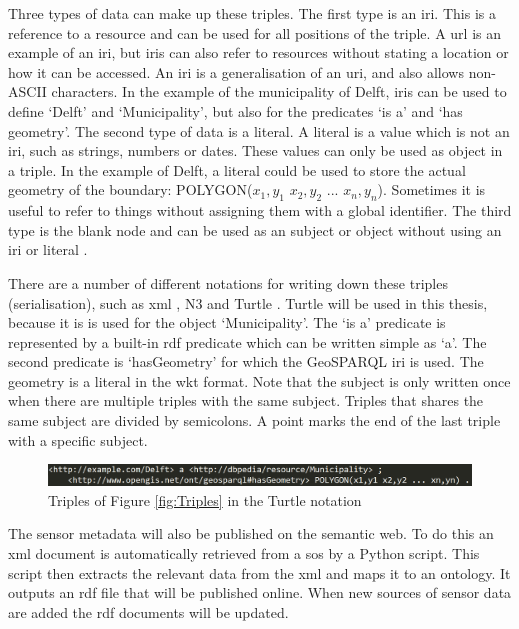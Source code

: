 Three types of data can make up these triples. The first type is an \ac{iri}. This is a reference to a resource and can be used for all positions of the triple. A \ac{url} is an example of an \ac{iri}, but \ac{iri}s can also refer to resources without stating a location or how it can be accessed. An \ac{iri} is a generalisation of an \ac{uri}, and also allows non-ASCII characters. In the example of the municipality of Delft, \ac{iri}s can be used to define `Delft' and `Municipality', but also for the predicates `is a' and `has geometry'. The second type of data is a literal. A literal is a value which is not an \ac{iri}, such as strings, numbers or dates. These values can only be used as object in a triple. In the example of Delft, a literal could be used to store the actual geometry of the boundary: POLYGON($x_{1},y_{1}$ $x_{2},y_{2}$ ... $x_{n},y_{n}$). Sometimes it is useful to refer to things without assigning them with a global identifier. The third type is the blank node and can be used as an subject or object without using an \ac{iri} or literal \citep{LD:W3C6}.  

There are a number of different notations for writing down these triples (serialisation), such as \ac{xml} \citep{LD:W3C3}, N3 \citep{LD:W3C5} and Turtle \citep{LD:W3C4}. Turtle will be used in this thesis, because it is is used for the object `Municipality'. The `is a' predicate is represented by a built-in \ac{rdf} predicate which can be written simple as `a'. The second predicate is `hasGeometry' for which the GeoSPARQL \ac{iri} is used. The geometry is a literal in the \ac{wkt} format. Note that the subject is only written once when there are multiple triples with the same subject. Triples that shares the same subject are divided by semicolons. A point marks the end of the last triple with a specific subject.

\begin{figure}
	\includegraphics[width=1\linewidth]{figs/Turtle.png}
	\caption{Triples of Figure \ref{fig:Triples} in the Turtle notation}
	\label{fig:Turtle}
\end{figure}

The sensor metadata will also be published on the semantic web. To do this an \ac{xml} document is automatically retrieved from a \ac{sos} by a Python script. This script then extracts the relevant data from the \ac{xml} and maps it to an ontology. It outputs an \ac{rdf} file that will be published online. When new sources of sensor data are added the \ac{rdf} documents will be updated.   

